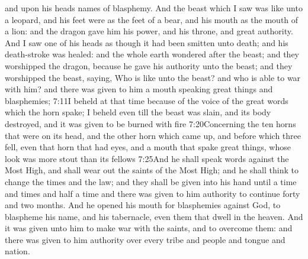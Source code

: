  and upon his heads names of blasphemy. 
And the beast which I saw was like unto a leopard, and his feet were as the feet of a bear, and his mouth as the mouth of a lion: and the dragon gave him his power, and his throne, and great authority. 
And I saw one of his heads as though it had been smitten unto death; and his death-stroke was healed: and the whole earth wondered after the beast; 
and they worshipped the dragon, because he gave his authority unto the beast; and they worshipped the beast, saying, Who is like unto the beast?
 and who is able to war with him? 
and there was given to him a mouth speaking great things and blasphemies;%
				       {7:11}{I beheld at that time because of the voice of the great words which the horn spake; I beheld even till the beast was slain, and its body destroyed, and it was given to be burned with fire}%
					   {7:20}{Concerning the ten horns that were on its head, and the other horn which came up, and before which three fell, even that horn that had eyes, and a mouth that spake great things, whose look was more stout than its fellows}
					   {7:25}{And he shall speak words against the Most High, and shall wear out the saints of the Most High; and he shall think to change the times and the law; and they shall be given into his hand until a time and times and half a time}
 and there was given to him authority to continue forty and two months. 
And he opened his mouth for blasphemies against God, to blaspheme his name, and his tabernacle, even them that dwell in the heaven.%
And it was given unto him to make war with the saints, and to overcome them: and there was given to him authority over every tribe and people and tongue and nation. 
